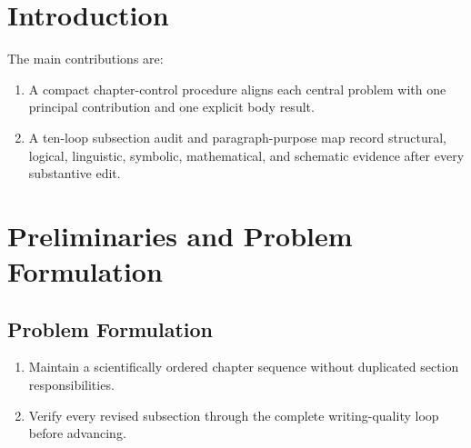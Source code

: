 \documentclass{article}
\begin{document}
\begin{abstract}
Reliable manuscript construction requires more than grammatical correction.
This fixture represents a compact journal structure in which the chapter
sequence, local argument, notation, equations, terminology, and schematic
handoff are checked after every substantive edit. The method uses a frozen
conception context to keep each section tied to one scientific question and
one reader-facing result, while its notation registry defines every
mathematical object before use. A subsection audit then records the logical
role of adjacent sentences, the causal chain from the motivating limitation to
the proposed mechanism and its consequence, and the assumptions and dimensions
needed by each formula. It also verifies that every retained sentence has an
indispensable purpose and that required principle, model-structure, and
task-workflow schematics have a consistent LaTeX handoff. The resulting
workflow provides a repeatable record of revisions and blocks delivery whenever
an unresolved conflict remains. This record also supports transparent review
before figure and experiment work.
\end{abstract}

\section{Introduction}

The main contributions are:

\begin{enumerate}
\item A compact chapter-control procedure aligns each central problem with one
principal contribution and one explicit body result.
\item A ten-loop subsection audit and paragraph-purpose map record structural,
logical, linguistic, symbolic, mathematical, and schematic evidence after
every substantive edit.
\end{enumerate}

\section{Preliminaries and Problem Formulation}

\subsection{Problem Formulation}

\begin{enumerate}
\item Maintain a scientifically ordered chapter sequence without duplicated
section responsibilities.
\item Verify every revised subsection through the complete writing-quality
loop before advancing.
\end{enumerate}
\end{document}
